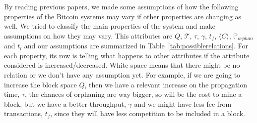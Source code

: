 \documentclass[USenglish]{uit-thesis}
\begin{document}
By reading previous papers, we made some assumptions of how
the following properties of the Bitcoin systems may vary if other
properties are changing as well. We tried to classify the main
properties of the system and make assumptions on how they
may vary. This attributes are $Q$, $\mathcal{T}$, $\tau$,
$\gamma$, $t_f$, $\langle C\rangle$, $\mathbb{P}_{orphan}$ and $t_l$ and
our assumptions are summarized in Table~\ref{tab:possiblerelations}. For
each property, its row is telling what happens to other attributes
if the attribute considered is increased/decreased. White space
means that there might be no relation or we don't have any assumption
yet. For example, if we are going to increase the block space $Q$,
then we have a relevant increase on the propagation time, $\tau$,
the chances of orphaning are way bigger, so will be the cost to mine a block,
but we have a better throughput, $\gamma$ and we might have
less fee from transactions, $t_f$, since they will have less competition
to be included in a block.
\end{document}
